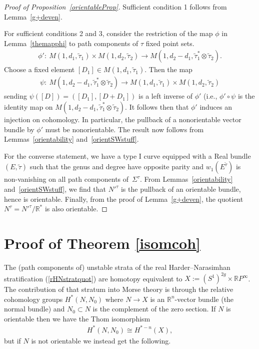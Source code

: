 \documentclass[pdftex]{sigma}
\numberwithin{equation}{section}
\begin{document}
\begin{proof}[Proof of Proposition~\ref{orientableProp}]
Suf\/f\/icient condition 1 follows from Lemma~\ref{g+deven}.

For suf\/f\/icient conditions 2 and 3, consider the restriction of the map $\phi$ in Lemma~\ref{themapphi} to path components of $\tau$ f\/ixed point sets.
\begin{gather*} \phi'\colon \ M(1,d_1, \tilde{\tau}_1) \times M(1,d_2,\tilde{\tau}_2) \rightarrow M(1,d_2-d_1, \tilde{\tau}_1^* \otimes \tilde{\tau}_2).\end{gather*}
Choose a f\/ixed element $[D_1] \in M(1,d_1, \tilde{\tau}_1)$. Then the map
\begin{gather*}\psi\colon \ M(1,d_2-d_1, \tilde{\tau}_1^* \otimes \tilde{\tau}_2) \rightarrow M(1,d_1, \tilde{\tau}_1) \times M(1,d_2,\tilde{\tau}_2)\end{gather*}
sending $\psi( [D]) = ( [D_1], [D +D_1])$ is a left inverse of $\phi'$ (i.e., $\phi' \circ \psi$ is the identity map on $M(1,d_2-d_1, \tilde{\tau}_1^* \otimes \tilde{\tau}_2 )$. It follows then that $\phi'$ induces an injection on cohomology. In particular, the pullback of a nonorientable vector bundle by $\phi'$ must be nonorientable. The result now follows from Lemmas~\ref{orientability} and~\ref{orientSWstuff}.

For the converse statement, we have a type I curve equipped with a Real bundle $(E,\tilde{\tau})$ such that the genus and degree have opposite parity and $w_1(E^{\tilde{\tau}})$ is non-vanishing on all path components of~$\Sigma^{\tau}$. From Lemmas~\ref{orientability} and~\ref{orientSWstuff}, we f\/ind that $N'^{\tau}$ is the pullback of an orientable bundle, hence is orientable. Finally, from the proof of Lemma~\ref{g+deven}, the quotient $N^{\tau} = N'^{\tau}/{\mathbb R}^*$ is also orientable.
\end{proof}

\section{Proof of Theorem \ref{isomcoh}}

The (path components of) unstable strata of the real Harder--Narasimhan stratif\/ication (\ref{rHNstratquot}) are homotopy equivalent to $X := (S^1)^{2g} \times {\mathbb R} P^{\infty} $. The contribution of that stratum into Morse theory is through the relative cohomology groups $H^*(N, N_0)$ where $N \rightarrow X$ is an ${\mathbb R}^n$-vector bundle (the normal bundle) and $N_0 \subset N$ is the complement of the zero section. If $N$ is orientable then we have the Thom isomorphism \begin{gather*}H^*(N, N_0) \cong H^{*-n}(X),\end{gather*}
but if $N$ is not orientable we instead get the following.
\end{document}
